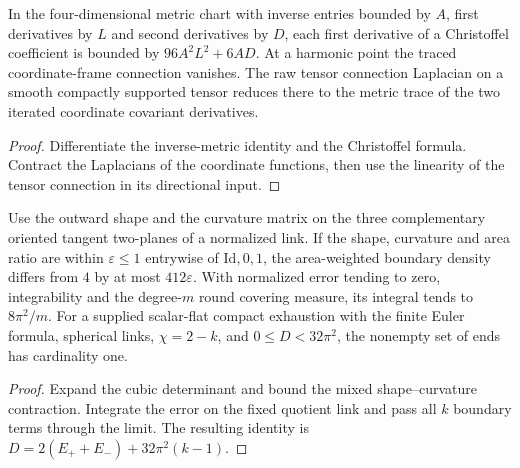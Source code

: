 \begin{proposition}
\label{prop:ed49-interior}
\leanok
In the four-dimensional metric chart with inverse entries bounded by $A$,
first derivatives by $L$ and second derivatives by $D$,
each first derivative of a Christoffel coefficient is bounded by
$96A^2 L^2+6AD$. At a harmonic point the traced coordinate-frame
connection vanishes. The raw tensor connection Laplacian on a smooth
compactly supported tensor reduces there to the metric trace of the
two iterated coordinate covariant derivatives.
\end{proposition}
\begin{proof}
\leanok
Differentiate the inverse-metric identity and the Christoffel formula.
Contract the Laplacians of the coordinate functions, then use the
linearity of the tensor connection in its directional input.
\end{proof}

\begin{proposition}
\label{prop:ed49-end}
\leanok
Use the outward shape and the curvature matrix on the three
complementary oriented tangent two-planes of a normalized link.
If the shape, curvature and area ratio are within $\varepsilon\le1$
entrywise of $\mathrm{Id},0,1$, the area-weighted boundary density
differs from $4$ by at most $412\varepsilon$.
With normalized error tending to zero, integrability and the degree-$m$
round covering measure, its integral tends to $8\pi^2/m$.
For a supplied scalar-flat compact exhaustion with the finite Euler
formula, spherical links, $\chi=2-k$, and $0\le D<32\pi^2$, the
nonempty set of ends has cardinality one.
\end{proposition}
\begin{proof}
\leanok
Expand the cubic determinant and bound the mixed shape--curvature contraction.
Integrate the error on the fixed quotient link and pass all $k$ boundary
terms through the limit. The resulting identity is
$D=2(E_++E_-)+32\pi^2(k-1)$.
\end{proof}

